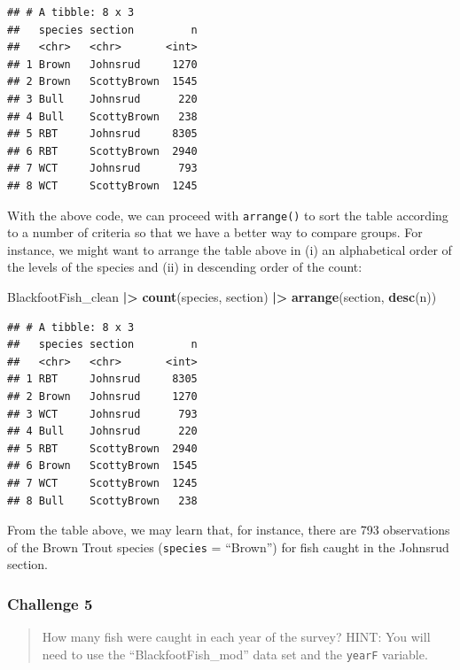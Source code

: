 \documentclass[
  10pt,
  letterpaper,
  twoside,
  openright]{book}
\newenvironment{Shaded}{\begin{snugshade}}{\end{snugshade}}
\newcommand{\FunctionTok}[1]{\textcolor[rgb]{0.13,0.29,0.53}{\textbf{#1}}}
\newcommand{\NormalTok}[1]{#1}
\newcommand{\SpecialCharTok}[1]{\textcolor[rgb]{0.81,0.36,0.00}{\textbf{#1}}}
\begin{document}
\begin{verbatim}
## # A tibble: 8 x 3
##   species section         n
##   <chr>   <chr>       <int>
## 1 Brown   Johnsrud     1270
## 2 Brown   ScottyBrown  1545
## 3 Bull    Johnsrud      220
## 4 Bull    ScottyBrown   238
## 5 RBT     Johnsrud     8305
## 6 RBT     ScottyBrown  2940
## 7 WCT     Johnsrud      793
## 8 WCT     ScottyBrown  1245
\end{verbatim}

With the above code, we can proceed with \texttt{arrange()} to sort the
table according to a number of criteria so that we have a better way to
compare groups. For instance, we might want to arrange the table above
in (i) an alphabetical order of the levels of the species and (ii) in
descending order of the count:

\begin{Shaded}
\begin{Highlighting}[]
\NormalTok{BlackfootFish\_clean }\SpecialCharTok{|\textgreater{}}
    \FunctionTok{count}\NormalTok{(species, section) }\SpecialCharTok{|\textgreater{}}
  \FunctionTok{arrange}\NormalTok{(section, }\FunctionTok{desc}\NormalTok{(n))}
\end{Highlighting}
\end{Shaded}

\begin{verbatim}
## # A tibble: 8 x 3
##   species section         n
##   <chr>   <chr>       <int>
## 1 RBT     Johnsrud     8305
## 2 Brown   Johnsrud     1270
## 3 WCT     Johnsrud      793
## 4 Bull    Johnsrud      220
## 5 RBT     ScottyBrown  2940
## 6 Brown   ScottyBrown  1545
## 7 WCT     ScottyBrown  1245
## 8 Bull    ScottyBrown   238
\end{verbatim}

From the table above, we may learn that, for instance, there are 793
observations of the Brown Trout species (\texttt{species} = ``Brown'')
for fish caught in the Johnsrud section.

\hypertarget{challenge-5}{%
\subsubsection{Challenge 5}\label{challenge-5}}

\begin{quote}
How many fish were caught in each year of the survey? HINT: You will
need to use the ``BlackfootFish\_mod'' data set and the \texttt{yearF}
variable.
\end{quote}
\end{document}
